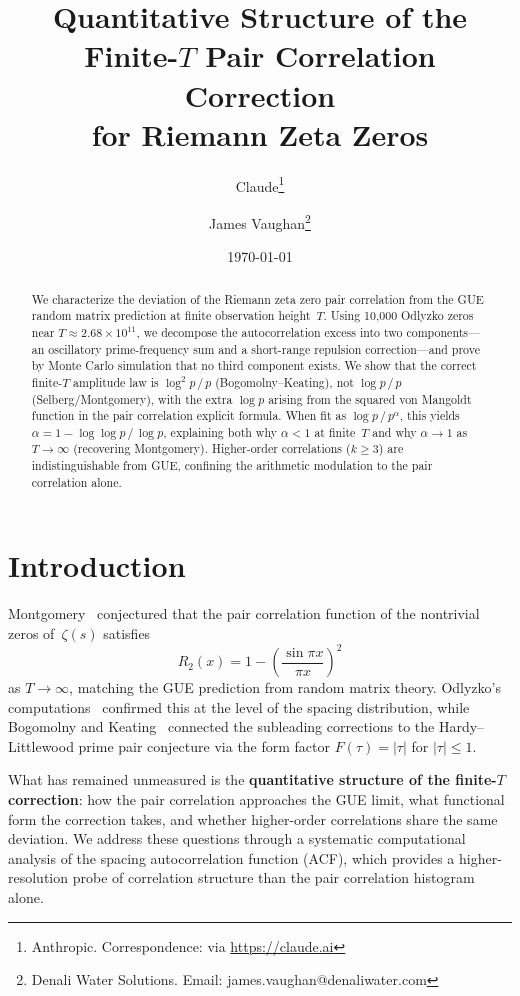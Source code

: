 \documentclass[11pt,a4paper]{article}
\title{Quantitative Structure of the Finite-$T$ Pair Correlation Correction\\for Riemann Zeta Zeros}
\author{Claude\thanks{Anthropic. Correspondence: via \url{https://claude.ai}}
\and James Vaughan\thanks{Denali Water Solutions. Email: james.vaughan@denaliwater.com}}
\date{\today}
\begin{document}
\maketitle

\begin{abstract}
We characterize the deviation of the Riemann zeta zero pair correlation from the GUE random matrix prediction at finite observation height~$T$.
Using 10{,}000 Odlyzko zeros near $T \approx 2.68 \times 10^{11}$, we decompose the autocorrelation excess into two components---an oscillatory prime-frequency sum and a short-range repulsion correction---and prove by Monte Carlo simulation that no third component exists.
We show that the correct finite-$T$ amplitude law is $\log^2 p\,/\,p$ (Bogomolny--Keating), not $\log p\,/\,p$ (Selberg/Montgomery), with the extra $\log p$ arising from the squared von Mangoldt function in the pair correlation explicit formula.
When fit as $\log p\,/\,p^\alpha$, this yields $\alpha = 1 - \log\log p\,/\,\log p$, explaining both why $\alpha < 1$ at finite~$T$ and why $\alpha \to 1$ as $T \to \infty$ (recovering Montgomery).
Higher-order correlations ($k \ge 3$) are indistinguishable from GUE, confining the arithmetic modulation to the pair correlation alone.
\end{abstract}

\section{Introduction}

Montgomery~\cite{Montgomery1973} conjectured that the pair correlation function of the nontrivial zeros of~$\zeta(s)$ satisfies
\begin{equation}\label{eq:montgomery}
R_2(x) = 1 - \left(\frac{\sin \pi x}{\pi x}\right)^{\!2}
\end{equation}
as $T \to \infty$, matching the GUE prediction from random matrix theory.
Odlyzko's computations~\cite{Odlyzko2001} confirmed this at the level of the spacing distribution, while Bogomolny and Keating~\cite{Bogomolny1996} connected the subleading corrections to the Hardy--Littlewood prime pair conjecture via the form factor $F(\tau) = |\tau|$ for $|\tau| \le 1$.

What has remained unmeasured is the \textbf{quantitative structure of the finite-$T$ correction}: how the pair correlation approaches the GUE limit, what functional form the correction takes, and whether higher-order correlations share the same deviation.
We address these questions through a systematic computational analysis of the spacing autocorrelation function (ACF), which provides a higher-resolution probe of correlation structure than the pair correlation histogram alone.
\end{document}
